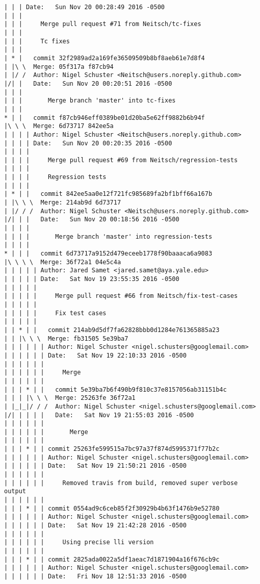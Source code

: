 \begin{lstlisting}
| | | Date:   Sun Nov 20 00:28:49 2016 -0500
| | | 
| | |     Merge pull request #71 from Neitsch/tc-fixes
| | |     
| | |     Tc fixes
| | |      
| * |   commit 32f2989ad2a169fe36509509b8bf8aeb61e7d8f4
| |\ \  Merge: 05f317a f87cb94
| |/ /  Author: Nigel Schuster <Neitsch@users.noreply.github.com>
|/| |   Date:   Sun Nov 20 00:20:51 2016 -0500
| | |   
| | |       Merge branch 'master' into tc-fixes
| | |      
* | |   commit f87cb946eff0389be01d20ba5e62ff9882b6b94f
|\ \ \  Merge: 6d73717 842ee5a
| | | | Author: Nigel Schuster <Neitsch@users.noreply.github.com>
| | | | Date:   Sun Nov 20 00:20:35 2016 -0500
| | | | 
| | | |     Merge pull request #69 from Neitsch/regression-tests
| | | |     
| | | |     Regression tests
| | | |       
| * | |   commit 842ee5aa0e12f721fc985689fa2bf1bff66a167b
| |\ \ \  Merge: 214ab9d 6d73717
| |/ / /  Author: Nigel Schuster <Neitsch@users.noreply.github.com>
|/| | |   Date:   Sun Nov 20 00:18:56 2016 -0500
| | | |   
| | | |       Merge branch 'master' into regression-tests
| | | |       
* | | |   commit 6d73717a9152d479eceeb1778f90baaaca6a9083
|\ \ \ \  Merge: 36f72a1 04e5c4a
| | | | | Author: Jared Samet <jared.samet@aya.yale.edu>
| | | | | Date:   Sat Nov 19 23:55:35 2016 -0500
| | | | | 
| | | | |     Merge pull request #66 from Neitsch/fix-test-cases
| | | | |     
| | | | |     Fix test cases
| | | | |        
| | * | |   commit 214ab9d5df7fa62828bbb0d1284e761365885a23
| | |\ \ \  Merge: fb31505 5e39ba7
| | | | | | Author: Nigel Schuster <nigel.schusters@googlemail.com>
| | | | | | Date:   Sat Nov 19 22:10:33 2016 -0500
| | | | | | 
| | | | | |     Merge
| | | | | |         
| | | * | |   commit 5e39ba7b6f490b9f810c37e8157056ab31151b4c
| | | |\ \ \  Merge: 25263fe 36f72a1
| |_|_|/ / /  Author: Nigel Schuster <nigel.schusters@googlemail.com>
|/| | | | |   Date:   Sat Nov 19 21:55:03 2016 -0500
| | | | | |   
| | | | | |       Merge
| | | | | |       
| | | * | | commit 25263fe599515a7bc97a37f874d5995371f77b2c
| | | | | | Author: Nigel Schuster <nigel.schusters@googlemail.com>
| | | | | | Date:   Sat Nov 19 21:50:21 2016 -0500
| | | | | | 
| | | | | |     Removed travis from build, removed super verbose output
| | | | | |       
| | | * | | commit 0554ad9c6ceb85f2f30929b4b63f1476b9e52780
| | | | | | Author: Nigel Schuster <nigel.schusters@googlemail.com>
| | | | | | Date:   Sat Nov 19 21:42:28 2016 -0500
| | | | | | 
| | | | | |     Using precise lli version
| | | | | |       
| | | * | | commit 2825ada0022a5df1aeac7d1871904a16f676cb9c
| | | | | | Author: Nigel Schuster <nigel.schusters@googlemail.com>
| | | | | | Date:   Fri Nov 18 12:51:33 2016 -0500

\end{lstlisting}
